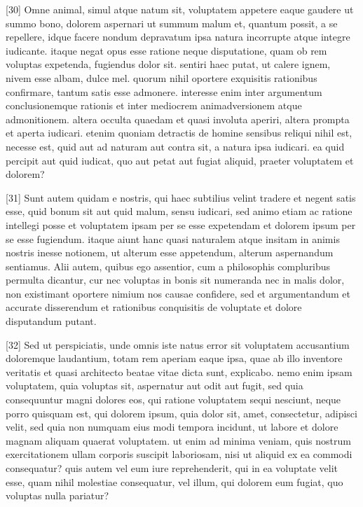\documentclass{article}
\begin{document}
[30] Omne animal, simul atque natum sit, voluptatem appetere eaque gaudere ut summo bono, dolorem aspernari ut summum malum et, quantum possit, a se repellere, idque facere nondum depravatum ipsa natura incorrupte atque integre iudicante. itaque negat opus esse ratione neque disputatione, quam ob rem voluptas expetenda, fugiendus dolor sit. sentiri haec putat, ut calere ignem, nivem esse albam, dulce mel. quorum nihil oportere exquisitis rationibus confirmare, tantum satis esse admonere. interesse enim inter argumentum conclusionemque rationis et inter mediocrem animadversionem atque admonitionem. altera occulta quaedam et quasi involuta aperiri, altera prompta et aperta iudicari. etenim quoniam detractis de homine sensibus reliqui nihil est, necesse est, quid aut ad naturam aut contra sit, a natura ipsa iudicari. ea quid percipit aut quid iudicat, quo aut petat aut fugiat aliquid, praeter voluptatem et dolorem?

[31] Sunt autem quidam e nostris, qui haec subtilius velint tradere et negent satis esse, quid bonum sit aut quid malum, sensu iudicari, sed animo etiam ac ratione intellegi posse et voluptatem ipsam per se esse expetendam et dolorem ipsum per se esse fugiendum. itaque aiunt hanc quasi naturalem atque insitam in animis nostris inesse notionem, ut alterum esse appetendum, alterum aspernandum sentiamus. Alii autem, quibus ego assentior, cum a philosophis compluribus permulta dicantur, cur nec voluptas in bonis sit numeranda nec in malis dolor, non existimant oportere nimium nos causae confidere, sed et argumentandum et accurate disserendum et rationibus conquisitis de voluptate et dolore disputandum putant.

[32] Sed ut perspiciatis, unde omnis iste natus error sit voluptatem accusantium doloremque laudantium, totam rem aperiam eaque ipsa, quae ab illo inventore veritatis et quasi architecto beatae vitae dicta sunt, explicabo. nemo enim ipsam voluptatem, quia voluptas sit, aspernatur aut odit aut fugit, sed quia consequuntur magni dolores eos, qui ratione voluptatem sequi nesciunt, neque porro quisquam est, qui dolorem ipsum, quia dolor sit, amet, consectetur, adipisci velit, sed quia non numquam eius modi tempora incidunt, ut labore et dolore magnam aliquam quaerat voluptatem. ut enim ad minima veniam, quis nostrum exercitationem ullam corporis suscipit laboriosam, nisi ut aliquid ex ea commodi consequatur? quis autem vel eum iure reprehenderit, qui in ea voluptate velit esse, quam nihil molestiae consequatur, vel illum, qui dolorem eum fugiat, quo voluptas nulla pariatur?
\end{document}
